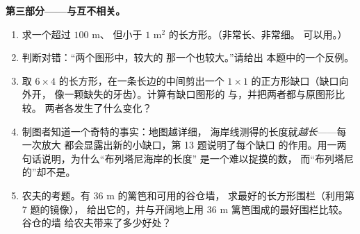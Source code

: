 \begin{problem}
\medskip
\noindent\textbf{第三部分——与互不相关。}
\begin{enumerate}[resume]
  \item 求一个超过 $100$ m、
        但小于 $1$ m$^2$ 的长方形。（非常长、非常细。
        可以用。）
  \item 判断对错：“两个图形中，较大的
        那一个也较大。”请给出
        本题中的一个反例。
  \item 取 $6 \times 4$ 的长方形，在一条长边的中间剪出一个 $1 \times 1$
        的正方形缺口（缺口向外开，
        像一颗缺失的牙齿）。计算有缺口图形的
        与，并把两者都与原图形比较。
        两者各发生了什么变化？
  \item 制图者知道一个奇特的事实：地图越详细，
        海岸线测得的长度就\emph{越长}——每一次放大
        都会显露出新的小缺口，第 13 题说明了每个缺口
        的作用。用一两句话说明，为什么“布列塔尼海岸的长度”
        是一个难以捉摸的数，
        而“布列塔尼的”却不是。
  \item 农夫的考题。有 $36$ m 的篱笆和可用的谷仓墙，
        求最好的长方形围栏（利用第 7 题的镜像），
        给出它的，并与开阔地上用
        $36$ m 篱笆围成的最好围栏比较。谷仓的墙
        给农夫带来了多少好处？
\end{enumerate}
\end{problem}
